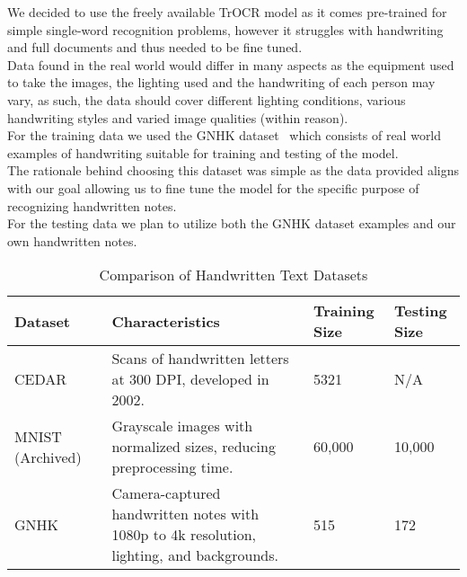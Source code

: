 \documentclass[twoside,a4paper]{article}
\begin{document}
We decided to use the freely available TrOCR model as it comes pre-trained for simple single-word recognition problems, however it struggles with handwriting and full documents and thus needed to be fine tuned.\\
Data found in the real world would differ in many aspects as the equipment used to take the images, the lighting used and the handwriting of each person may vary, as such, the data should cover different lighting conditions, various handwriting styles and varied image qualities (within reason). \\
For the training data we used the GNHK dataset~\cite{Lee2021} which consists of real world examples of handwriting suitable for training and testing of the model. \\
The rationale behind choosing this dataset was simple as the data provided aligns with our goal allowing us to fine tune the model for the specific purpose of recognizing handwritten notes.\\
For the testing data we plan to utilize both the GNHK dataset examples and our own handwritten notes.
\newpage
\begin{table}[!ht]
    \centering
    
    \caption{Comparison of Handwritten Text Datasets}
    \renewcommand{\arraystretch}{1.3} %
    \begin{tabular}{|p{3cm}|p{5cm}|p{2.5cm}|p{2.5cm}|}
    \hline
        \textbf{Dataset} & \textbf{Characteristics} & \textbf{Training Size} & \textbf{Testing Size} \\ \hline
        CEDAR~\cite{CEDAR_Dataset} & Scans of handwritten letters at 300 DPI, developed in 2002. & 5321 & N/A \\ \hline
        MNIST (Archived)~\cite{MNIST_Dataset} & Grayscale images with normalized sizes, reducing preprocessing time. & 60,000 & 10,000 \\ \hline
        GNHK~\cite{Lee2021s} & Camera-captured handwritten notes with 1080p to 4k resolution, lighting, and backgrounds. & 515 & 172 \\ \hline
    \end{tabular}
    \label{tab:datasets}
\end{table}
\end{document}
